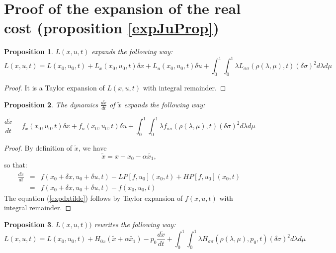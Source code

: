 \documentclass[a4paper,10pt]{article}
\newtheorem{proposition}{Proposition}
\begin{document}
\section{Proof of the expansion of the real cost (proposition \ref{expJuProp})}\label{ProofExpJU}
\begin{proposition}\label{expLprop}
    $L(x,u,t)$ expands the following way:
    \begin{equation}
        L(x,u,t) = L(x_{0},u_{0},t) + L_{x}(x_{0},u_{0},t) \delta x  
	           + L_{u}(x_{0},u_{0},t) \delta u
		   + \int_{0}^{1} \int_{0}^{1} 
		   \lambda L_{\sigma \sigma}(\rho(\lambda,\mu),t)(\delta \sigma)^{2} d \lambda d \mu
        \label{expL}
    \end{equation}
\end{proposition}
\begin{proof}
    It is a Taylor expansion of $L(x,u,t)$ with integral remainder.
\end{proof}
\begin{proposition}\label{expdxtildeprop}
    The dynamics $\frac{d \tilde{x}}{dt}$ of $\tilde{x}$ expands the 
    following way:
    
 \begin{equation}
        \frac{d \tilde{x}}{dt} = f_{x}(x_{0},u_{0},t) \delta x  + f_{u}(x_{0},u_{0},t) \delta u
		   + \int_{0}^{1} \int_{0}^{1} 
		   \lambda f_{\sigma \sigma}(\rho(\lambda,\mu),t)(\delta \sigma)^{2} d \lambda d \mu
        \label{expdxtilde}
    \end{equation}
\end{proposition}
\begin{proof}
    By definition of $\tilde{x}$, we have
    \[
        \tilde{x} = x - x_{0} - \alpha \tilde{x_{1}},
    \]
    so that:
    \begin{eqnarray*}
        \frac{d \tilde{x}}{dt} & = & f(x_{0}+\delta x,u_{0} + \delta u,t)
	 - LP[f,u_{0}](x_{0},t) + HP[f,u_{0}](x_{0},t)\\
          & = & f(x_{0}+\delta x,u_{0} + \delta u,t) - f(x_{0},u_{0},t)
    \end{eqnarray*}
The equation (\ref{expdxtilde}) follows by Taylor expansion of 
$f(x,u,t)$ with integral remainder.
\end{proof}
\begin{proposition}\label{expL1prop}
    $L(x,u,t))$ rewrites the following way:
\begin{equation}
        L(x,u,t) = L(x_{0},u_{0},t) + H_{0x} (\tilde{x} +\alpha \tilde{x_{1}}) 
	           - p_{0} \frac{d \tilde{x}}{dt} 
		   + \int_{0}^{1} \int_{0}^{1} 
		   \lambda H_{\sigma \sigma}(\rho(\lambda,\mu),p_{0},t)(\delta \sigma)^{2} d \lambda d \mu
        \label{expL1}
    \end{equation}  
\end{proposition}
\end{document}
